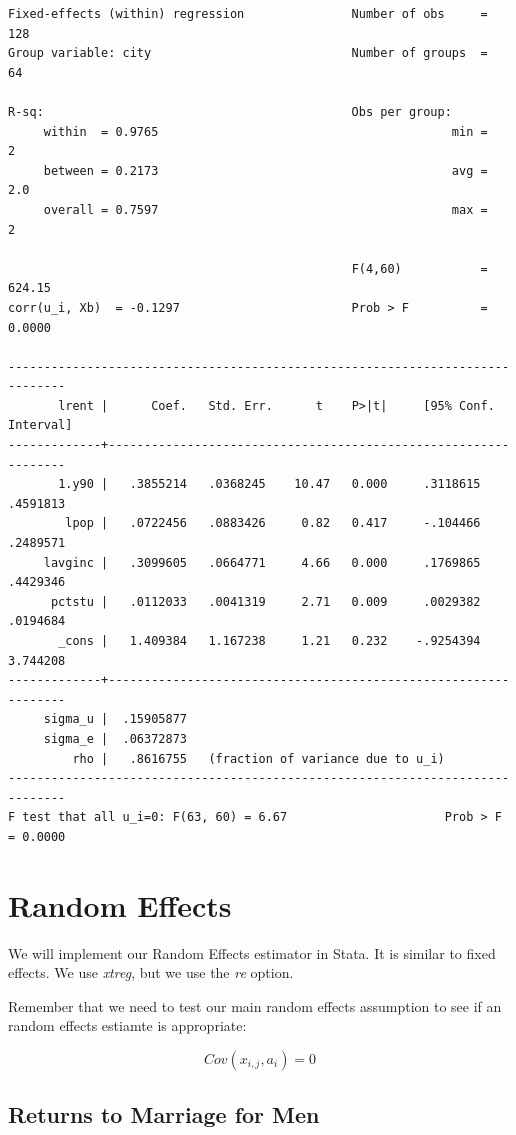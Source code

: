 \documentclass[
]{book}
\begin{document}
\begin{verbatim}
Fixed-effects (within) regression               Number of obs     =        128
Group variable: city                            Number of groups  =         64

R-sq:                                           Obs per group:
     within  = 0.9765                                         min =          2
     between = 0.2173                                         avg =        2.0
     overall = 0.7597                                         max =          2

                                                F(4,60)           =     624.15
corr(u_i, Xb)  = -0.1297                        Prob > F          =     0.0000

------------------------------------------------------------------------------
       lrent |      Coef.   Std. Err.      t    P>|t|     [95% Conf. Interval]
-------------+----------------------------------------------------------------
       1.y90 |   .3855214   .0368245    10.47   0.000     .3118615    .4591813
        lpop |   .0722456   .0883426     0.82   0.417     -.104466    .2489571
     lavginc |   .3099605   .0664771     4.66   0.000     .1769865    .4429346
      pctstu |   .0112033   .0041319     2.71   0.009     .0029382    .0194684
       _cons |   1.409384   1.167238     1.21   0.232    -.9254394    3.744208
-------------+----------------------------------------------------------------
     sigma_u |  .15905877
     sigma_e |  .06372873
         rho |   .8616755   (fraction of variance due to u_i)
------------------------------------------------------------------------------
F test that all u_i=0: F(63, 60) = 6.67                      Prob > F = 0.0000
\end{verbatim}

\chapter{Random Effects}\label{random-effects}

We will implement our Random Effects estimator in Stata. It is similar to fixed effects. We use \emph{xtreg}, but we use the \emph{re} option.

Remember that we need to test our main random effects assumption to see if an random effects estiamte is appropriate:

\[ Cov(x_{i,j},a_i)=0 \]

\section{Returns to Marriage for Men}\label{returns-to-marriage-for-men}
\end{document}
